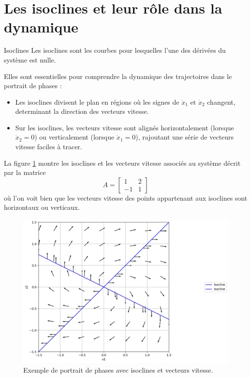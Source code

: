     \section{Les isoclines et leur rôle dans la dynamique}
        \begin{definition}{Isoclines}
            Les isoclines sont les courbes pour lesquelles l'une des dérivées du système est nulle.
        \end{definition}
        Elles sont essentielles pour comprendre la dynamique des trajectoires dans le portrait de phases :
        \begin{itemize}
            \item Les isoclines divisent le plan en régions où les signes de $\dot{x}_1$ et $\dot{x}_2$ changent, determinant la direction des vecteurs vitesse.
            \item Sur les isoclines, les vecteurs vitesse sont alignés horizontalement (lorsque $\dot{x}_2 = 0$) ou verticalement (lorsque $\dot{x}_1 = 0$), rajoutant une série de vecteurs vitesse faciles à tracer.
        \end{itemize}
        La figure \ref{fig:isoclines} montre les isoclines et les vecteurs vitesse associés au système décrit par la matrice
        \begin{equation}
            A = \begin{bmatrix} 1 & 2 \\ -1 & 1 \end{bmatrix}
        \end{equation}
        où l'on voit bien que les vecteurs vitesse des points appartenant aux isoclines sont horizontaux ou verticaux.
        \begin{figure}[ht!]
            \centering
            \includegraphics[width=\textwidth]{images/isoclines.jpg}
            \caption{Exemple de portrait de phases avec isoclines et vecteurs vitesse.}
            \label{fig:isoclines}
        \end{figure}
            
